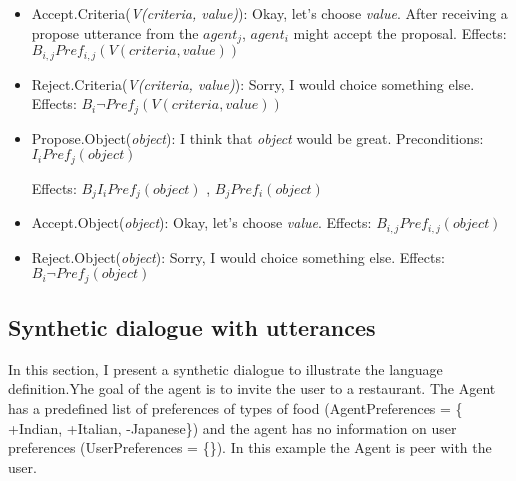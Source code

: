 \documentclass{llncs}
\begin{document}
\begin{itemize}
 \item Accept.Criteria(\textit{V(criteria, value)}): Okay, let's choose \textit{value}. After receiving a propose utterance from the $agent_{j}$,  $agent_{i}$ might accept the proposal.
   \subitem Effects:  $B_{i,j} Pref_{i,j}(V(criteria, value))$
   
 \item Reject.Criteria(\textit{V(criteria, value)}): Sorry, I would choice something else.
    \subitem Effects:  $B_{i} \neg  Pref_{j}(V(criteria, value))$
 
  \item Propose.Object(\textit{object}): I think that \textit{object} would be great.
  \subitem Preconditions:  $ I_{i} Pref_{j}(object)$
  
  \subitem Effects:  $B_{j} I_{i} Pref_{j}(object)$ ,  $ B_{j} Pref_{i}(object)$  
  \item Accept.Object(\textit{object}): Okay, let's choose \textit{value}.
     \subitem Effects:  $B_{i,j} Pref_{i,j}(object)$ 
  
  \item Reject.Object(\textit{object}): Sorry, I would choice something else.
      \subitem Effects:  $B_{i} \neg  Pref_{j}(object)$
 \end{itemize} 


 \subsection{Synthetic dialogue with utterances}
 In this section, I present a synthetic dialogue to illustrate the language definition.Yhe goal of the agent is to invite the user to a restaurant. The Agent has a predefined list of preferences of types of food (AgentPreferences = \{ +Indian, +Italian, -Japanese\}) and the agent has no information on user preferences (UserPreferences = \{\}). In this example the Agent is peer with the user. 


\begin{minipage}{0.45\textwidth}
 
\end{minipage}%
\hfill
\begin{minipage}{0.45\textwidth}

\end{minipage}%


\noindent 
\vskip 4pt


\end{document}
